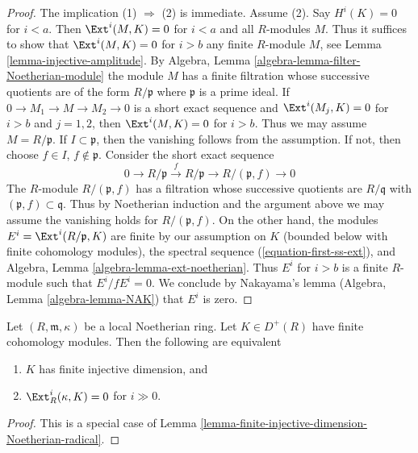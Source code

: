 \begin{proof}
The implication (1) $\Rightarrow$ (2) is immediate. Assume (2).
Say $H^i(K) = 0$ for $i < a$. Then $\Ext^i(M, K) = 0$ for $i < a$ and
all $R$-modules $M$. Thus it suffices to show that
$\Ext^i(M, K) = 0$ for $i > b$ any finite $R$-module $M$, see
Lemma \ref{lemma-injective-amplitude}.
By Algebra, Lemma \ref{algebra-lemma-filter-Noetherian-module}
the module $M$ has a finite filtration whose successive
quotients are of the form $R/\mathfrak p$ where $\mathfrak p$ is
a prime ideal. If $0 \to M_1 \to M \to M_2 \to 0$
is a short exact sequence and $\Ext^i(M_j, K) = 0$ for $i > b$
and $j = 1, 2$, then $\Ext^i(M, K) = 0$ for $i > b$.
Thus we may assume $M = R/\mathfrak p$.
If $I \subset \mathfrak p$, then the vanishing follows
from the assumption. If not, then choose $f \in I$, $f \not \in \mathfrak p$.
Consider the short exact sequence
$$
0 \to R/\mathfrak p \xrightarrow{f} R/\mathfrak p \to R/(\mathfrak p, f) \to 0
$$
The $R$-module $R/(\mathfrak p, f)$ has a filtration whose successive
quotients are $R/\mathfrak q$ with $(\mathfrak p, f) \subset \mathfrak q$.
Thus by Noetherian induction and the argument above
we may assume the vanishing holds for $R/(\mathfrak p, f)$.
On the other hand, the modules
$E^i = \Ext^i(R/\mathfrak p, K)$ are finite by our assumption on $K$
(bounded below with finite cohomology modules), the spectral
sequence (\ref{equation-first-ss-ext}), and
Algebra, Lemma \ref{algebra-lemma-ext-noetherian}.
Thus $E^i$ for $i > b$ is a finite $R$-module
such that $E^i/fE^i = 0$.  We conclude by Nakayama's lemma
(Algebra, Lemma \ref{algebra-lemma-NAK})
that $E^i$ is zero.
\end{proof}

\begin{lemma}
\label{lemma-finite-injective-dimension-Noetherian-local}
Let $(R, \mathfrak m, \kappa)$ be a local Noetherian ring.
Let $K \in D^+(R)$ have finite cohomology modules.
Then the following are equivalent
\begin{enumerate}
\item $K$ has finite injective dimension, and
\item $\Ext^i_R(\kappa, K) = 0$ for $i \gg 0$.
\end{enumerate}
\end{lemma}

\begin{proof}
This is a special case of
Lemma \ref{lemma-finite-injective-dimension-Noetherian-radical}.
\end{proof}






